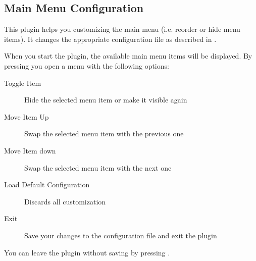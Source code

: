 \subsection{Main Menu Configuration}
{\label{ref:main_menu_config}}

This plugin helps you customizing the main menu (i.e. reorder or hide menu
items). It changes the appropriate configuration file as described in
.

When you start the plugin, the available main menu items will be displayed.
By pressing \ActionStdOk{} you open a menu with the following options:
\begin{description}
\item[Toggle Item] Hide the selected menu item or make it visible again
\item[Move Item Up] Swap the selected menu item with the previous one
\item[Move Item down] Swap the selected menu item with the next one
\item[Load Default Configuration] Discards all customization
\item[Exit] Save your changes to the configuration file and exit the plugin
\end{description}
You can leave the plugin without saving by pressing \ActionStdCancel{}.
